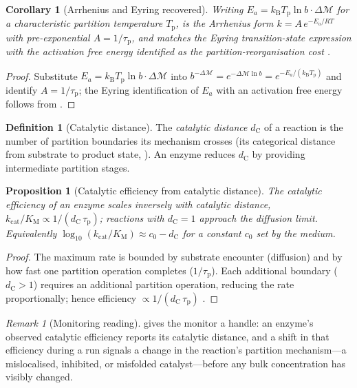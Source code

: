 \documentclass[11pt,twocolumn,a4paper]{article}
\theoremstyle{thmstyle}
\newtheorem{proposition}[theorem]{Proposition}
\newtheorem{corollary}[theorem]{Corollary}
\theoremstyle{definition}
\newtheorem{definition}[theorem]{Definition}
\theoremstyle{remark}
\newtheorem{remark}[theorem]{Remark}
\newcommand{\kB}{k_{\mathrm{B}}}
\newcommand{\Depth}{\mathcal{M}}
\newcommand{\dC}{d_{\mathrm{C}}}
\newcommand{\taup}{\tau_{\mathrm{p}}}
\begin{document}
\begin{corollary}[Arrhenius and Eyring recovered]
\label{cor:arrhenius}
Writing $E_a=\kB T_{\mathrm{p}}\ln b\cdot\Delta\Depth$ for a characteristic
partition temperature $T_{\mathrm{p}}$,  is the Arrhenius
form $k=A\,e^{-E_a/RT}$ with pre-exponential $A=1/\taup$, and matches the
Eyring transition-state expression with the activation free energy
identified as the partition-reorganisation cost
\citep{arrhenius1889reaktionsgeschwindigkeit,eyring1935activated}.
\end{corollary}

\begin{proof}
Substitute $E_a=\kB T_{\mathrm{p}}\ln b\cdot\Delta\Depth$ into
$b^{-\Delta\Depth}=e^{-\Delta\Depth\ln b}=e^{-E_a/(\kB T_{\mathrm{p}})}$ and
identify $A=1/\taup$; the Eyring identification of $E_a$ with an activation
free energy follows from 
\citep{eyring1935activated,atkins2018physical}.
\end{proof}

\begin{definition}[Catalytic distance]
\label{def:catalytic-distance}
The \emph{catalytic distance} $\dC$ of a reaction is the number of
partition boundaries its mechanism crosses (its categorical distance from
substrate to product state, ). An enzyme reduces $\dC$ by
providing intermediate partition stages.
\end{definition}

\begin{proposition}[Catalytic efficiency from catalytic distance]
\label{prop:efficiency}
The catalytic efficiency of an enzyme scales inversely with catalytic
distance, $k_{\mathrm{cat}}/K_{\mathrm{M}}\propto 1/(\dC\,\taup)$; reactions
with $\dC=1$ approach the diffusion limit. Equivalently
$\log_{10}(k_{\mathrm{cat}}/K_{\mathrm{M}})\approx c_0-\dC$ for a constant
$c_0$ set by the medium.
\end{proposition}

\begin{proof}
The maximum rate is bounded by substrate encounter (diffusion) and by how
fast one partition operation completes ($1/\taup$). Each additional
boundary ($\dC>1$) requires an additional partition operation, reducing the
rate proportionally; hence efficiency $\propto1/(\dC\,\taup)$
\citep{michaelis1913kinetik,atkins2018physical}.
\end{proof}

\begin{remark}[Monitoring reading]
\label{rem:catalytic-monitoring}
 gives the monitor a handle: an enzyme's observed
catalytic efficiency reports its catalytic distance, and a shift in that
efficiency during a run signals a change in the reaction's partition
mechanism---a mislocalised, inhibited, or misfolded catalyst---before any
bulk concentration has visibly changed.
\end{remark}
\end{document}
